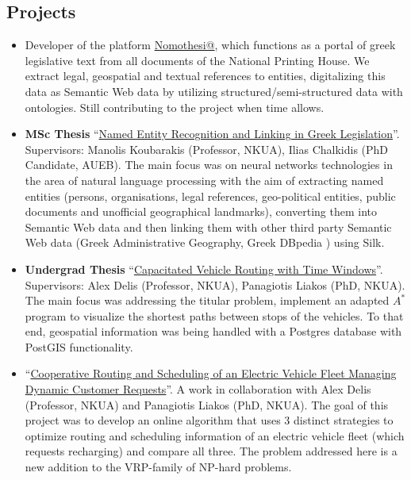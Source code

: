 \documentclass[a4paper,oneside,10pt]{article}
\begin{document}
\subsection*{Projects}

\begin{itemize}

\item Developer of the platform \href{http://legislation.di.uoa.gr/}{Nomothesi@}, which functions as a portal of greek legislative text from all documents of the National Printing House. We extract legal, geospatial and textual references to entities, digitalizing this data as Semantic Web data by utilizing structured/semi-structured data with ontologies. Still contributing to the project when time allows.

\item \begin{sloppypar}
\textbf{MSc Thesis} ``\href{https://pergamos.lib.uoa.gr/uoa/dl/frontend/en/browse/2766525}{Named Entity Recognition and Linking in Greek Legislation}''. Supervisors: Manolis Koubarakis (Professor, NKUA), Ilias Chalkidis (PhD Candidate, AUEB).
The main focus was on neural networks technologies in the area of natural language processing with the aim of extracting named entities (persons, organisations, legal references, geo-political entities, public documents and unofficial geographical landmarks), 
converting them into Semantic Web data and then linking them with other third party Semantic Web data (Greek Administrative Geography, Greek DBpedia ) using Silk.

\end{sloppypar}

\item \begin{sloppypar}
\textbf{Undergrad Thesis} ``\href{http://efessos.lib.uoa.gr/applications/disserts.nsf/0f1ab5fee83fbb88c225770c0042ce4f/8da6d56136caaacec2257ea6004c9349?OpenDocument}{Capacitated Vehicle Routing with Time Windows}''. Supervisors: Alex Delis (Professor, NKUA), Panagiotis Liakos (PhD, NKUA). 
The main focus was addressing the titular problem, implement an adapted $A^{*}$ program to visualize the shortest paths between stops of the vehicles. To that end, geospatial information was being handled with a Postgres database with PostGIS functionality.

\end{sloppypar}

\item \begin{sloppypar}
``\href{https://bitbucket.org/Metimdjai/vrppd/src/master/}{Cooperative Routing and Scheduling of an Electric Vehicle Fleet Managing Dynamic Customer Requests}''. A work in collaboration with Alex Delis (Professor, NKUA) and Panagiotis Liakos (PhD, NKUA). 
The goal of this project was to develop an online algorithm that uses 3 distinct strategies to optimize routing and scheduling information of an electric vehicle fleet (which requests recharging) and compare all three. The problem addressed here is a new addition to the VRP-family of NP-hard problems.


\end{sloppypar}
\end{itemize}
\end{document}
